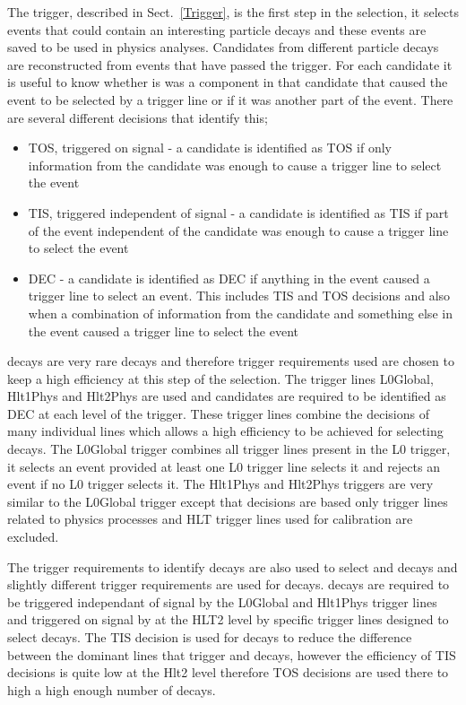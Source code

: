 The trigger, described in Sect.~\ref{Trigger}, is the first step in the selection, it selects events that could contain an interesting particle decays and these events are saved to be used in physics analyses. Candidates from different particle decays are reconstructed from events that have passed the trigger. For each candidate it is useful to know whether is was a component in that candidate that caused the event to be selected by a trigger line or if it was another part of the event. There are several different decisions that identify this;
\begin{itemize}
\item TOS, triggered on signal - a candidate is identified as TOS if only information from the candidate was enough to cause a trigger line to select the event
\item TIS, triggered independent of signal - a candidate is identified as TIS if part of the event independent of the candidate was enough to cause a trigger line to select the event
\item DEC - a candidate is identified as DEC if anything in the event caused a trigger line to select an event. This includes TIS and TOS decisions and also when a combination of information from the candidate and something else in the event caused a trigger line to select the event
\end{itemize}

\bsmumu decays are very rare decays and therefore trigger requirements used are chosen to keep a high efficiency at this step of the selection. The trigger lines L0Global, Hlt1Phys and Hlt2Phys are used and candidates are required to be identified as DEC at each level of the trigger. These trigger lines combine the decisions of many individual lines which allows a high efficiency to be achieved for selecting \bsmumu decays. The L0Global trigger combines all trigger lines present in the L0 trigger, it selects an event provided at least one L0 trigger line selects it and rejects an event if no L0 trigger selects it. The Hlt1Phys and Hlt2Phys triggers are very similar to the L0Global trigger except that decisions are based only trigger lines related to physics processes and HLT trigger lines used for calibration are excluded.

The trigger requirements to identify \bmumu decays are also used to select \bujpsik and \bsjpsiphi decays and slightly different trigger requirements are used for \bhh decays. \bhh decays are required to be triggered independant of signal by the L0Global and Hlt1Phys trigger lines and triggered on signal by at the HLT2 level by specific trigger lines designed to select \bhh decays. The TIS decision is used for \bhh decays to reduce the difference between the dominant lines that trigger \bhh and \bmumu decays, however the efficiency of TIS decisions is quite low at the Hlt2 level therefore TOS decisions are used there to high a high enough number of decays.

